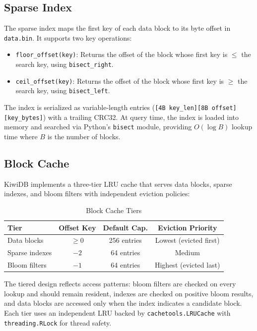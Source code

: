 \documentclass[conference]{IEEEtran}
\begin{document}
\subsection{Sparse Index}

The sparse index maps the first key of each data block to its byte offset in \texttt{data.bin}. It supports two key operations:

\begin{itemize}[leftmargin=*]
    \item \texttt{floor\_offset(key)}: Returns the offset of the block whose first key is $\leq$ the search key, using \texttt{bisect\_right}.
    \item \texttt{ceil\_offset(key)}: Returns the offset of the block whose first key is $\geq$ the search key, using \texttt{bisect\_left}.
\end{itemize}

The index is serialized as variable-length entries (\texttt{[4B key\_len][8B offset][key\_bytes]}) with a trailing CRC32. At query time, the index is loaded into memory and searched via Python's \texttt{bisect} module, providing $O(\log B)$ lookup time where $B$ is the number of blocks.

\subsection{Block Cache}

KiwiDB implements a three-tier LRU cache that serves data blocks, sparse indexes, and bloom filters with independent eviction policies:

\begin{table}[H]
\centering
\caption{Block Cache Tiers}
\label{tab:cache}
\begin{tabular}{@{}lccc@{}}
\toprule
\textbf{Tier} & \textbf{Offset Key} & \textbf{Default Cap.} & \textbf{Eviction Priority} \\
\midrule
Data blocks & $\geq 0$ & 256 entries & Lowest (evicted first) \\
Sparse indexes & $-2$ & 64 entries & Medium \\
Bloom filters & $-1$ & 64 entries & Highest (evicted last) \\
\bottomrule
\end{tabular}
\end{table}

The tiered design reflects access patterns: bloom filters are checked on every lookup and should remain resident, indexes are checked on positive bloom results, and data blocks are accessed only when the index indicates a candidate block. Each tier uses an independent LRU backed by \texttt{cachetools.LRUCache} with \texttt{threading.RLock} for thread safety.
\end{document}
